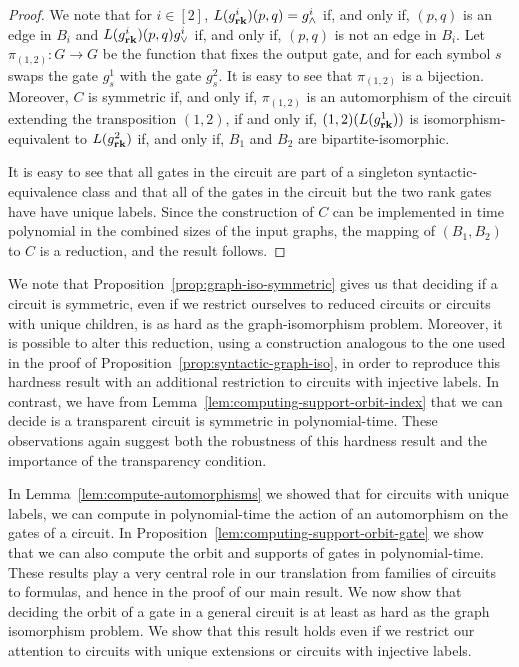 \documentclass[../paper.tex]{subfiles}
\begin{document}
\begin{proof}
  We note that for $i \in [2]$, $L(g^i_{\text{\textbf{rk}}})(p,q)= g^i_\land$ if, and only
  if, $(p,q)$ is an edge in $B_i$ and $L(g^i_{\text{\textbf{rk}}})(p,q) g^i_\lor$ if, and
  only if, $(p,q)$ is not an edge in $B_i$. Let $\pi_{(1,2)} : G \rightarrow G$
  be the function that fixes the output gate, and for each symbol $s$ swaps the
  gate $g^1_s$ with the gate $g^2_s$. It is easy to see that $\pi_{(1,2)}$ is a
  bijection. Moreover, $C$ is symmetric if, and only if, $\pi_{(1,2)}$ is an
  automorphism of the circuit extending the transposition $(1,2)$, if and only
  if, $(1,2) (L(g^1_{\text{\textbf{rk}}}))$ is isomorphism-equivalent to $L(g^2_{\text{\textbf{rk}}})$ if,
  and only if, $B_1$ and $B_2$ are bipartite-isomorphic.
 
  It is easy to see that all gates in the circuit are part of a singleton
  syntactic-equivalence class and that all of the gates in the circuit but the
  two rank gates have have unique labels. Since the construction of $C$ can be
  implemented in time polynomial in the combined sizes of the input graphs, the
  mapping of $(B_1, B_2)$ to $C$ is a reduction, and the result follows.
\end{proof}

We note that Proposition~\ref{prop:graph-iso-symmetric} gives us that deciding
if a circuit is symmetric, even if we restrict ourselves to reduced circuits or
circuits with unique children, is as hard as the graph-isomorphism problem.
Moreover, it is possible to alter this reduction, using a construction analogous
to the one used in the proof of Proposition~\ref{prop:syntactic-graph-iso}, in
order to reproduce this hardness result with an additional restriction to
circuits with injective labels. In contrast, we have from
Lemma~\ref{lem:computing-support-orbit-index} that we can decide is a
transparent circuit is symmetric in polynomial-time. These observations again
suggest both the robustness of this hardness result and the importance of the
transparency condition.

In Lemma~\ref{lem:compute-automorphisms} we showed that for circuits with unique
labels, we can compute in polynomial-time the action of an automorphism on the
gates of a circuit. In Proposition~\ref{lem:computing-support-orbit-gate} we
show that we can also compute the orbit and supports of gates in
polynomial-time. These results play a very central role in our translation from
families of circuits to formulas, and hence in the proof of our main result. We
now show that deciding the orbit of a gate in a general circuit is at least as
hard as the graph isomorphism problem. We show that this result holds even if we
restrict our attention to circuits with unique extensions or circuits with
injective labels.
\end{document}
